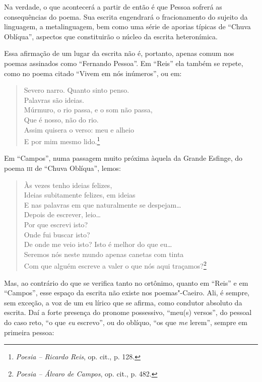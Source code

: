 Na verdade, o que acontecerá a partir de então é que Pessoa sofrerá as
consequências do poema. Sua escrita engendrará o fracionamento do
sujeito da linguagem, a metalinguagem, bem como uma série de aporias
típicas de ``Chuva Oblíqua'', aspectos que constituirão o núcleo da
escrita heteronímica.

Essa afirmação de um lugar da escrita não é, portanto, apenas comum nos
poemas assinados como ``Fernando Pessoa''. Em ``Reis'' ela também se
repete, como no poema citado ``Vivem em nós inúmeros'', ou em:

\begin{verse}
Severo narro. Quanto sinto penso.\\
Palavras são ideias.\\
Múrmuro, o rio passa, e o som não passa,\\
Que é nosso, não do rio.\\
Assim quisera o verso: meu e alheio\\
E por mim mesmo lido.\footnote{\emph{Poesia -- Ricardo Reis}, op. cit.,
  p. 128.}
\end{verse}

Em ``Campos'', numa passagem muito próxima àquela da Grande Esfinge, do
poema \textsc{iii} de ``Chuva Oblíqua'', lemos:

\begin{verse}
Às vezes tenho ideias felizes,\\
Ideias subitamente felizes, em ideias\\
E nas palavras em que naturalmente se \qb{}despejam\ldots{}\\[5pt]
Depois de escrever, leio\ldots{}\\
Por que escrevi isto?\\
Onde fui buscar isto?\\
De onde me veio isto? Isto é melhor do que \qb{}eu\ldots{}\\[5pt]
Seremos nós neste mundo apenas canetas \qb{}com tinta\\
Com que alguém escreve a valer o que nós \qb{}aqui traçamos?\footnote{\emph{Poesia
  -- Álvaro de Campos}, op. cit., p. 482.}
\end{verse}

Mas, ao contrário do que se verifica tanto no ortônimo, quanto em
``Reis'' e em ``Campos'', esse espaço da escrita não existe nos
poemas"-Caeiro. Ali, é sempre, sem exceção, a voz de um eu lírico que se
afirma, como condutor absoluto da escrita. Daí a forte presença do
pronome possessivo, ``meu(s) versos'', do pessoal do caso reto, ``o que
\emph{eu} escrevo'', ou do oblíquo, ``os que \emph{me} lerem'', sempre
em primeira pessoa:

